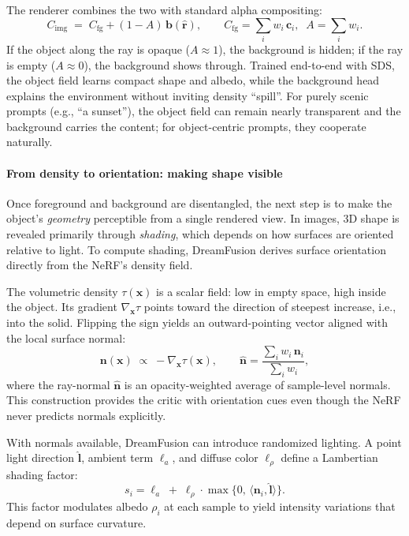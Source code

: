 \begin{enrichment}
\begin{enrichment}
        \noindent The renderer combines the two with standard alpha compositing:
        \[
        C_{\mathrm{img}} \;=\; C_{\mathrm{fg}} + (1-A)\,\mathbf{b}(\hat{\mathbf{r}}),
        \qquad
        C_{\mathrm{fg}}=\sum_i w_i\,\mathbf{c}_i,\;\;
        A=\sum_i w_i .
        \]
        If the object along the ray is opaque (\(A\!\approx\!1\)), the background is hidden; if the ray is empty (\(A\!\approx\!0\)), the background shows through. Trained end-to-end with SDS, the object field learns compact shape and albedo, while the background head explains the environment without inviting density “spill”. For purely scenic prompts (e.g., “a sunset”), the object field can remain nearly transparent and the background carries the content; for object-centric prompts, they cooperate naturally.
        
        \paragraph{From density to orientation: making shape visible}
        \label{par:chapter23_dreamfusion_normals}
        
        Once foreground and background are disentangled, the next step is to make the object’s \emph{geometry} perceptible from a single rendered view. In images, 3D shape is revealed primarily through \emph{shading}, which depends on how surfaces are oriented relative to light. To compute shading, DreamFusion derives surface orientation directly from the NeRF’s density field.  
        
        \newpage
        
        The volumetric density \(\tau(\mathbf{x})\) is a scalar field: low in empty space, high inside the object. Its gradient \(\nabla_{\mathbf{x}}\tau\) points toward the direction of steepest increase, i.e., into the solid. Flipping the sign yields an outward-pointing vector aligned with the local surface normal:
        \[
        \mathbf{n}(\mathbf{x}) \;\propto\; -\nabla_{\mathbf{x}} \tau(\mathbf{x}), 
        \qquad
        \hat{\mathbf{n}}=\frac{\sum_i w_i\,\mathbf{n}_i}{\sum_i w_i},
        \]
        where the ray-normal \(\hat{\mathbf{n}}\) is an opacity-weighted average of sample-level normals. This construction provides the critic with orientation cues even though the NeRF never predicts normals explicitly.  
        
        With normals available, DreamFusion can introduce randomized lighting. A point light direction \(\hat{\mathbf{l}}\), ambient term \(\boldsymbol{\ell}_a\), and diffuse color \(\boldsymbol{\ell}_\rho\) define a Lambertian shading factor:
        \[
        s_i = \boldsymbol{\ell}_a \;+\; \boldsymbol{\ell}_\rho \cdot \max\{0,\,\langle \mathbf{n}_i, \hat{\mathbf{l}}\rangle\}.
        \]
        This factor modulates albedo \(\rho_i\) at each sample to yield intensity variations that depend on surface curvature.  
        

\end{enrichment}
\end{enrichment}
